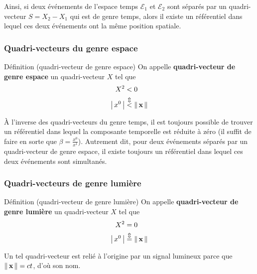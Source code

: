         Ainsi, si deux événements de l’espace temps $\mathcal{E}_1$ et $\mathcal{E}_2$ sont séparés par un quadri-vecteur $S = X_2 - X_1$ qui est de genre temps, alors il existe un référentiel dans lequel ces deux événements ont la même position spatiale.

        \subsubsection{Quadri-vecteurs du genre espace}

        \begin{omed}{Définition (quadri-vecteur de genre espace)}
            On appelle \textbf{quadri-vecteur de genre espace} un quadri-vecteur $X$ tel que 
            \begin{align*}
                X^2 &< 0 \\
                \left\lvert \, x^0 \, \right\rvert &\overset{\Updownarrow}{<} \left\lVert \, \mathbf{x} \, \right\rVert \\
            \end{align*}
        \end{omed}

        À l’inverse des quadri-vecteurs du genre temps, il est toujours possible de trouver un référentiel dans lequel la composante temporelle est réduite à zéro (il suffit de faire en sorte que $\beta = \frac{x^0}{x^1}$). Autrement dit, pour deux événements séparés par un quadri-vecteur de genre espace, il existe toujours un référentiel dans lequel ces deux événements sont simultanés.

        \subsubsection{Quadri-vecteurs de genre lumière}

        \begin{omed}{Définition (quadri-vecteur de genre lumière)}
            On appelle \textbf{quadri-vecteur de genre lumière} un quadri-vecteur $X$ tel que 
            \begin{align*}
                X^2 &= 0 \\
                \left\lvert \, x^0 \, \right\rvert &\overset{\Updownarrow}{=} \left\lVert \, \mathbf{x} \, \right\rVert \\
            \end{align*}
        \end{omed}

        Un tel quadri-vecteur est relié à l’origine par un signal lumineux parce que $\left\lVert \, \mathbf{x} \, \right\rVert = ct$, d’où son nom.


